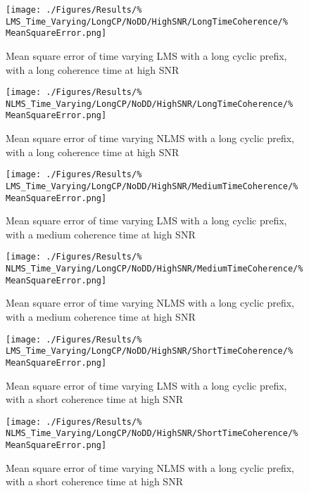 \begin{figure}[ht]
	\begin{minipage}{0.49\textwidth}
		\texttt{[image: ./Figures/Results/\%
	LMS\_Time\_Varying/LongCP/NoDD/HighSNR/LongTimeCoherence/\%
	MeanSquareError.png]}
		\caption{Mean square error of time varying LMS with a 
		long cyclic prefix, with a long coherence time at 
		high SNR}
	\end{minipage}
	\begin{minipage}{0.49\textwidth}
		\texttt{[image: ./Figures/Results/\%
	NLMS\_Time\_Varying/LongCP/NoDD/HighSNR/LongTimeCoherence/\%
	MeanSquareError.png]}
		\caption{Mean square error of time varying NLMS with 
		a long cyclic prefix, with a long coherence time at 
		high SNR}
	\end{minipage}
\end{figure}

\begin{figure}[ht]
	\begin{minipage}{0.49\textwidth}
		\texttt{[image: ./Figures/Results/\%
	LMS\_Time\_Varying/LongCP/NoDD/HighSNR/MediumTimeCoherence/\%
	MeanSquareError.png]}
		\caption{Mean square error of time varying LMS with a 
		long cyclic prefix, with a medium coherence time at 
		high SNR}
	\end{minipage}
	\begin{minipage}{0.49\textwidth}
		\texttt{[image: ./Figures/Results/\%
	NLMS\_Time\_Varying/LongCP/NoDD/HighSNR/MediumTimeCoherence/\%
	MeanSquareError.png]}
		\caption{Mean square error of time varying NLMS with 
		a long cyclic prefix, with a medium coherence time
		at high SNR}
	\end{minipage}
\end{figure}

\begin{figure}[ht]
	\centering
	\begin{minipage}{0.49\textwidth}
		\centering
		\texttt{[image: ./Figures/Results/\%
	LMS\_Time\_Varying/LongCP/NoDD/HighSNR/ShortTimeCoherence/\%
	MeanSquareError.png]}
		\caption{Mean square error of time varying LMS with a 
		long cyclic prefix, with a short coherence time at 
		high SNR}
		\label{fig:LMS-Short-High-None}
	\end{minipage}
	\begin{minipage}{0.49\textwidth}
		\centering
		\texttt{[image: ./Figures/Results/\%
	NLMS\_Time\_Varying/LongCP/NoDD/HighSNR/ShortTimeCoherence/\%
	MeanSquareError.png]}
		\caption{Mean square error of time varying NLMS with 
		a long cyclic prefix, with a short coherence time 
		at high SNR}
	\end{minipage}
\end{figure}

